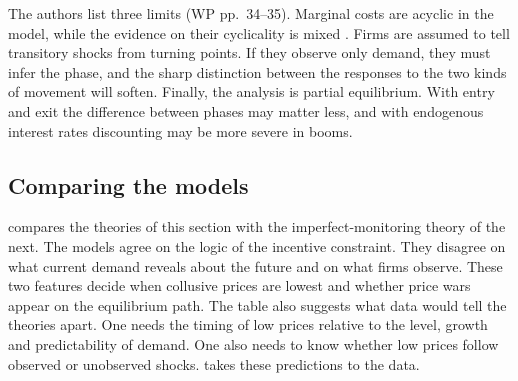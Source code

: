 The authors list three limits (WP pp.~34--35). Marginal costs are acyclic in the model, while the evidence on their
cyclicality is mixed \citep{Bils1987,MironZeldes1988}. Firms are assumed to tell transitory shocks from turning points.
If they observe only demand, they must infer the phase, and the sharp distinction between the responses to the two
kinds of movement will soften. Finally, the analysis is partial equilibrium. With entry and exit the difference between
phases may matter less, and with endogenous interest rates discounting may be more severe in booms.

\subsection{Comparing the models}\label{sec:12-demand-compare}

 compares the theories of this section with the imperfect-monitoring theory of the next.
The models agree on the logic of the incentive constraint. They disagree on what current demand reveals about the
future and on what firms observe. These two features decide when collusive prices are lowest and whether price wars
appear on the equilibrium path. The table also suggests what data would tell the theories apart. One needs the timing
of low prices relative to the level, growth and predictability of demand. One also needs to know whether low prices
follow observed or unobserved shocks.  takes these predictions to the data.

